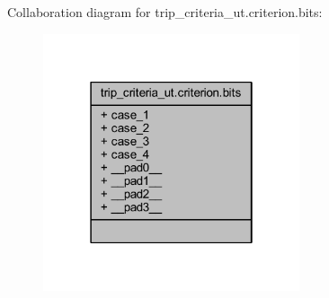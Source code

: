 Collaboration diagram for trip\+\_\+criteria\+\_\+ut.\+criterion.\+bits\+:
\nopagebreak
\begin{figure}[H]
\begin{center}
\leavevmode
\includegraphics[width=214pt]{d9/d01/a00227}
\end{center}
\end{figure}

